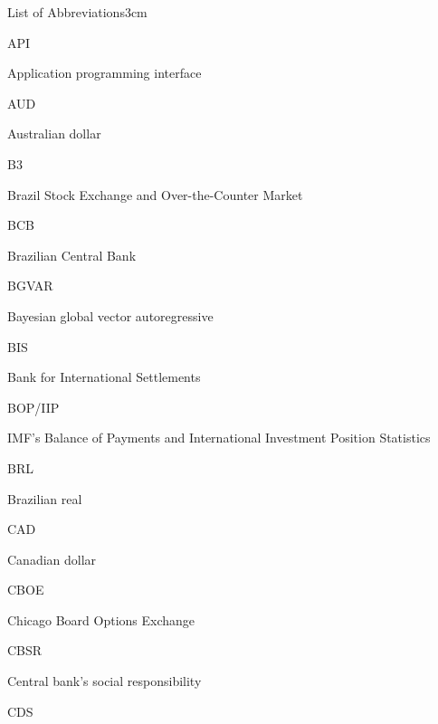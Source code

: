 \documentclass[a4paper, twoside]{templates/ociamthesis}
\begin{document}
\begin{romanpages}
\listoffigures
	\mtcaddchapter

\listoftables
  \mtcaddchapter
\begin{mclistof}{List of Abbreviations}{3cm}

\item[API]

Application programming interface

\item[AUD]

Australian dollar

\item[B3]

Brazil Stock Exchange and Over-the-Counter Market

\item[BCB]

Brazilian Central Bank

\item[BGVAR]

Bayesian global vector autoregressive

\item[BIS]

Bank for International Settlements

\item[BOP/IIP]

IMF's Balance of Payments and International Investment Position Statistics

\item[BRL]

Brazilian real

\item[CAD]

Canadian dollar

\item[CBOE]

Chicago Board Options Exchange

\item[CBSR]

Central bank's social responsibility

\item[CDS]


\end{mclistof}
\end{romanpages}
\end{document}
